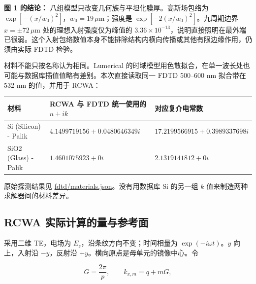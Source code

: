 \documentclass[
  chinese,
  UTF8,
  a4paper,
  11pt]{ctexart}
\newcounter{none} %
\begin{document}
\textbf{图 1 的结论：} 八组模型只改变几何族与平坦化膜厚。高斯场包络为
\(\exp[-(x/w_0)^2]\)，\(w_0=19\,\mu\mathrm m\)；强度是
\(\exp[-2(x/w_0)^2]\)。九周期边界 \(x=\pm72\,\mu\mathrm m\)
处的理想入射强度仅为峰值的
\(3.36\times10^{-13}\)，说明直接照明在最外端已很弱。这个入射包络数值本身不能排除结构内横向传播或其他有限边缘作用，仍须由实际
FDTD 检验。

材料不能只按名称认为相同。Lumerical
的时域模型用色散拟合，在单一波长处也可能与数据库插值值略有差别。本次直接读取同一
FDTD 500--600 nm 拟合带在 532 nm 的值，并用于 RCWA：

{\def\LTcaptype{none} %
\begin{longtable}[]{@{}
  >{\raggedright\arraybackslash}p{}
  >{\raggedleft\arraybackslash}p{}
  >{\raggedleft\arraybackslash}p{}@{}}
\toprule\noalign{}
\begin{minipage}[b]{\linewidth}\raggedright
材料
\end{minipage} & \begin{minipage}[b]{\linewidth}\raggedleft
RCWA 与 FDTD 统一使用的 \(n+ik\)
\end{minipage} & \begin{minipage}[b]{\linewidth}\raggedleft
对应复介电常数
\end{minipage} \\
\midrule\noalign{}
\endhead
\bottomrule\noalign{}
\endlastfoot
Si (Silicon) - Palik & \(4.1499719156+0.0480646349i\) &
\(17.2199566915+0.3989337698i\) \\
SiO2 (Glass) - Palik & \(1.4601075923+0i\) & \(2.1319141812+0i\) \\
\end{longtable}
}

原始探测结果见
\href{../fdtd/materials.json}{fdtd/materials.json}。没有用数据库 Si
的另一组 \(k\) 值来制造两种求解器间的材料差异。

\subsection{RCWA
实际计算的量与参考面}\label{rcwa-ux5b9eux9645ux8ba1ux7b97ux7684ux91cfux4e0eux53c2ux8003ux9762}

采用二维 TE，电场为 \(E_z\)，沿条纹方向不变；时间相量为
\(\exp(-i\omega t)\)。\(y\) 向上，入射沿 \(-y\)，反射沿
\(+y\)。横向原点是母单元的镜像中心。令

\[
G=\frac{2\pi}{p},\qquad k_{x,m}=q+mG,
\]
\end{document}

